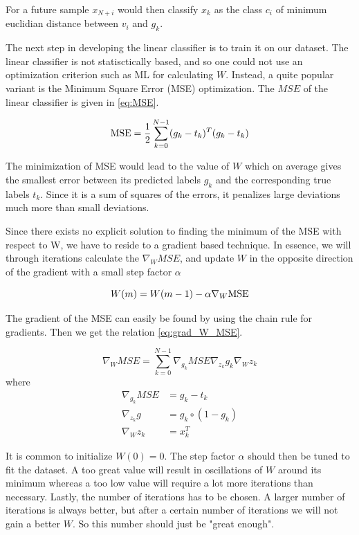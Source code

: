 \documentclass{article}
\begin{document}
For a future sample $x_{N+i}$ would then classify $x_k$ as the class $c_i$ of minimum euclidian
distance between $v_i$ and $g_k$.

The next step in developing the linear classifier is to train it on our dataset.
The linear classifier is not statisctically based, and so one could not use an optimization
criterion such as ML for calculating $W$. Instead, a quite popular variant is the Minimum Square
Error (MSE) optimization. The $MSE$ of the linear classifier is given in \eqref{eq:MSE}.

\begin{equation}
    \textnormal{MSE} = \frac{1}{2} \sum_{k=0}^{N-1} (g_k - t_k)^T(g_k - t_k) \label{eq:MSE}
\end{equation}

The minimization of MSE would lead to the value of $W$ which on average gives the smallest error
between its predicted labels $g_k$ and the corresponding true labels $t_k$. Since it is a sum of
squares of the errors, it penalizes large deviations much more than small deviations.

Since there exists no explicit solution to finding the minimum of the MSE with respect to W,
we have to reside to a gradient based technique. In essence, we will through iterations calculate
the $\nabla_W MSE$, and update $W$ in the opposite direction of the gradient with a
small step factor $\alpha$

\begin{equation}
    W(m) = W(m-1) - \alpha \nabla_W\textnormal{MSE} \label{eq:W_iteration}
\end{equation}

The gradient of the MSE can easily be found by using the chain rule for gradients. Then we get the
relation \eqref{eq:grad_W_MSE}.

\begin{equation}
    \nabla_WMSE = \sum_{k=0}^{N-1} \nabla_{g_k} MSE \nabla_{z_k} g_k \nabla_W z_k \label{eq:grad_W_MSE}
\end{equation}
where
\begin{align*}
    \nabla_{g_{k}} M S E &=g_{k}-t_{k} \\
    \nabla_{z_{k}} g &=g_{k} \circ\left(1-g_{k}\right) \\
    \nabla_{W} z_{k} &=x_{k}^{T}
\end{align*}

It is common to initialize $W(0) = 0$. The step factor $\alpha$ should then be tuned to fit the dataset.
A too great value will result in oscillations of $W$ around its minimum whereas a too low value will
require a lot more iterations than necessary. Lastly, the number of iterations has to be chosen.
A larger number of iterations is always better, but after a certain number of iterations we will
not gain a better $W$. So this number should just be "great enough".
\end{document}
